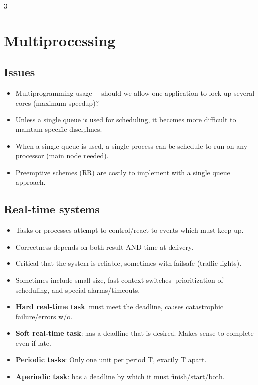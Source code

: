 \documentclass[fontsize=4.5pt]{scrartcl}
\begin{document}
\begin{multicols}{3}
  \section{Multiprocessing}
    \subsection{Issues}
      \begin{itemize}
        \item Multiprogramming usage--- should we allow one application to lock up several cores (maximum speedup)?
        \item Unless a single queue is used for scheduling, it becomes more difficult to maintain specific disciplines.
        \item When a single queue is used, a single process can be schedule to run on any processor (main node needed).
        \item Preemptive schemes (RR) are costly to implement with a single queue approach.
      \end{itemize}
     \subsection{Real-time systems}
       \begin{itemize}
         \item Tasks or processes attempt to control/react to events which must keep up.
         \item Correctness depends on both result AND time at delivery.
         \item Critical that the system is reliable, sometimes with failsafe (traffic lights).
         \item Sometimes include small size, fast context switches, prioritization of scheduling, and special alarms/timeouts.
         \item \textbf{Hard real-time task}: must meet the deadline, causes catastrophic failure/errors w/o.
         \item \textbf{Soft real-time task}: has a deadline that is desired. Makes sense to complete even if late.
         \item \textbf{Periodic tasks}: Only one unit per period T, exactly T apart.
         \item \textbf{Aperiodic task}: has a deadline by which it must finish/start/both.
       \end{itemize}

\end{multicols}
\end{document}
